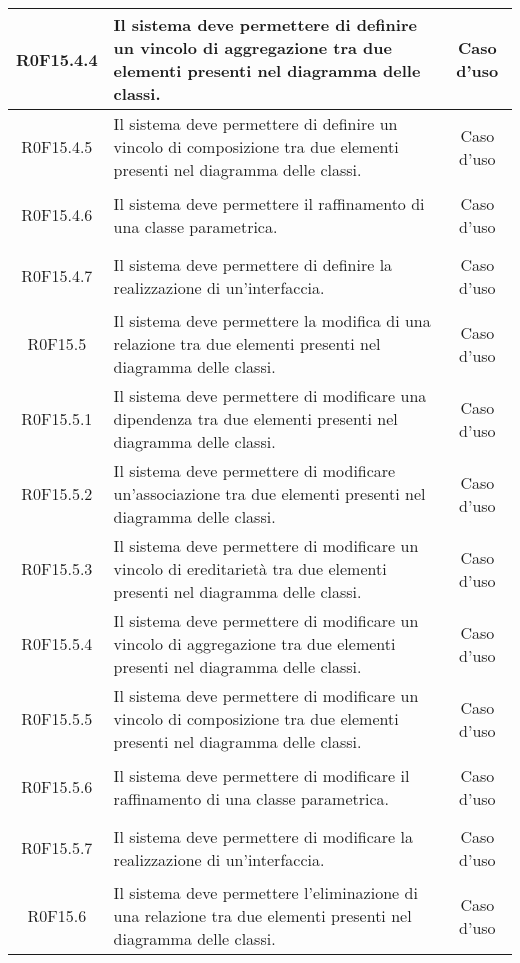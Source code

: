 \documentclass[../AnalisiDeiRequisiti.tex]{subfiles}
\begin{document}
\begin{longtable}{|c|>{\centering}p{7cm}|c|}
\hypertarget{R0F15.4.4}{R0F15.4.4} & Il sistema deve permettere di definire un vincolo di aggregazione tra due elementi presenti nel diagramma delle classi. & Caso d'uso \\ \hline
\hypertarget{R0F15.4.5}{R0F15.4.5} & Il sistema deve permettere di definire un vincolo di composizione tra due elementi presenti nel diagramma delle classi. & Caso d'uso \\ \hline
\hypertarget{R0F15.4.6}{R0F15.4.6} & Il sistema deve permettere il raffinamento di una classe parametrica. & Caso d'uso \\ \hline
\hypertarget{R0F15.4.7}{R0F15.4.7} & Il sistema deve permettere di definire la realizzazione di un'interfaccia. & Caso d'uso \\ \hline
\hypertarget{R0F15.5}{R0F15.5} & Il sistema deve permettere la modifica di una relazione tra due elementi presenti nel diagramma delle classi. & Caso d'uso \\ \hline
\hypertarget{R0F15.5.1}{R0F15.5.1} & Il sistema deve permettere di modificare una dipendenza tra due elementi presenti nel diagramma delle classi. & Caso d'uso \\ \hline
\hypertarget{R0F15.5.2}{R0F15.5.2} & Il sistema deve permettere di modificare un'associazione tra due elementi presenti nel diagramma delle classi. & Caso d'uso \\ \hline
\hypertarget{R0F15.5.3}{R0F15.5.3} & Il sistema deve permettere di modificare un vincolo di ereditarietà tra due elementi presenti nel diagramma delle classi. & Caso d'uso \\ \hline
\hypertarget{R0F15.5.4}{R0F15.5.4} & Il sistema deve permettere di modificare un vincolo di aggregazione tra due elementi presenti nel diagramma delle classi. & Caso d'uso \\ \hline
\hypertarget{R0F15.5.5}{R0F15.5.5} & Il sistema deve permettere di modificare un vincolo di composizione tra due elementi presenti nel diagramma delle classi. & Caso d'uso \\ \hline
\hypertarget{R0F15.5.6}{R0F15.5.6} & Il sistema deve permettere di modificare il raffinamento di una classe parametrica.  & Caso d'uso \\ \hline
\hypertarget{R0F15.5.7}{R0F15.5.7} & Il sistema deve permettere di modificare la realizzazione di un'interfaccia. & Caso d'uso \\ \hline
\hypertarget{R0F15.6}{R0F15.6} & Il sistema deve permettere l'eliminazione di una relazione tra due elementi presenti nel diagramma delle classi. & Caso d'uso \\ \hline

\end{longtable}
\end{document}
